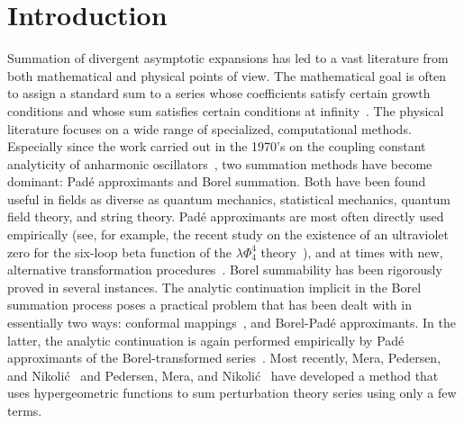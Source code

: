 \documentclass[12pt]{iopart}
\begin{document}
\section{Introduction}
Summation of divergent asymptotic expansions has led to a vast literature from both mathematical and
physical points of view. The mathematical goal is often to assign a standard sum to a series whose coefficients satisfy 
certain growth conditions and whose sum satisfies certain conditions at infinity~\cite{HA49,RA93}.
The physical literature focuses on a wide range of specialized, computational methods. Especially since the work
carried out in the 1970's on the coupling constant analyticity of anharmonic oscillators~\cite{GR70,SI70,HS78},
two summation methods have become dominant: Pad\'e approximants and
Borel summation. Both have been found useful in fields as diverse as quantum mechanics, statistical mechanics,
quantum field theory, and string theory. Pad\'e approximants are most often directly used empirically
(see, for example, the recent study on the existence of an ultraviolet zero for the six-loop beta function
of the $\lambda\Phi_4^4$ theory~\cite{SH16}), and at times with new, alternative transformation procedures~\cite{AM07}.
Borel summability has been rigorously proved in several instances. The analytic continuation implicit
in the Borel summation process poses a practical problem that has been dealt with in essentially two ways:
conformal mappings~\cite{LG77,ZJ02,ZJ10}, and Borel-Pad\'e approximants. In the latter, the analytic
continuation is again performed empirically by Pad\'e approximants
of the Borel-transformed series~\cite{GR70,BA76,FR85,AL00}.
%
Most recently, Mera, Pedersen, and Nikoli\'c~\cite{ME15,MH16} and Pedersen, Mera, and Nikoli\'c~\cite{PE16}
have developed a method that uses hypergeometric functions
to sum perturbation theory series using only a few terms. 
\end{document}
